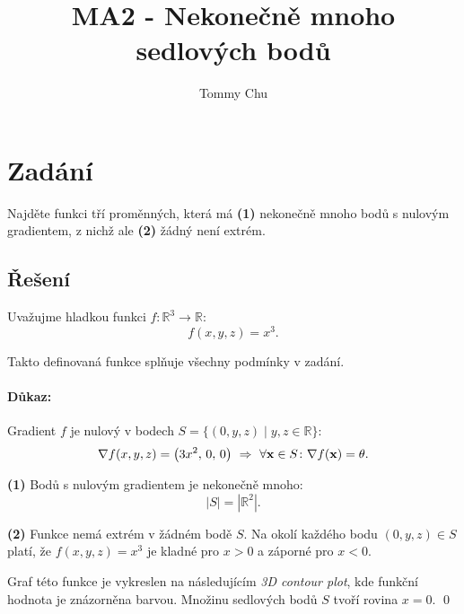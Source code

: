 \documentclass[a4paper]{article}
\title{MA2 - Nekonečně mnoho sedlových bodů}
\author{Tommy Chu}
\date{}
\begin{document}
\maketitle

\section*{Zadání}

Najděte funkci tří proměnných, která má \textbf{(1)} nekonečně mnoho bodů s nulovým gradientem, z nichž ale \textbf{(2)} žádný není extrém.

\subsection*{Řešení}

Uvažujme hladkou funkci $f \colon \mathbb{R}^3 \rightarrow \mathbb{R}$:
\[
    f(x,y,z) = x^3.
\]

Takto definovaná funkce splňuje všechny podmínky v zadání.

\paragraph*{Důkaz:}

Gradient $f$ je nulový v bodech ${ S = \bigl\{ (0,y,z) \mid y,z \in \mathbb{R} \bigr\} }$:
\[
    \nabla f(x,y,z) = \big(3x^2,\, 0,\, 0\big) \ \Rightarrow \
    \forall \vb x \in S \colon \nabla f(\vb x) = \theta.
\]

\textbf{(1)} Bodů s nulovým gradientem je nekonečně mnoho:
\[
    |S| = |\mathbb{R}^2|.
\]

\textbf{(2)} Funkce nemá extrém v žádném bodě $S$. Na okolí každého bodu ${(0,y,z) \in S}$ platí, že ${f(x,y,z) = x^3}$ je kladné pro ${x>0}$ a záporné pro ${x<0}$.

Graf této funkce je vykreslen na následujícím \emph{3D contour plot}, kde funkční hodnota je znázorněna barvou.
Množinu sedlových bodů $S$ tvoří rovina ${x=0}$.
\qed

\begin{center}
    
\end{center}
\end{document}

